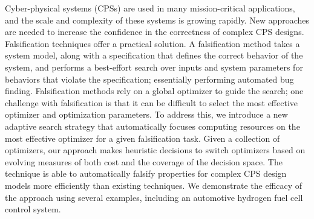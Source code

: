 Cyber-physical systems (CPSs) are used in many mission-critical applications, and the scale and complexity of these systems is growing rapidly.
New approaches are needed to increase the confidence in the correctness of complex CPS designs.
Falsification techniques offer a practical solution. 
A falsification method takes a system model, along with a specification that defines the correct behavior of the system, and performs a best-effort search over inputs and system parameters for behaviors that violate the specification; essentially performing automated bug finding.
Falsification methods rely on a global optimizer to guide the search; one challenge with falsification is that it can be difficult to select the most effective optimizer and optimization parameters.
To address this, we introduce a new adaptive search strategy that automatically focuses computing resources on the most effective optimizer for a given falsification task.
Given a collection of optimizers, our approach makes heuristic decisions to switch optimizers based on
evolving measures of both cost and the coverage of the decision space.
The technique is able to automatically falsify properties for complex CPS design models more efficiently than existing techniques.
We demonstrate the efficacy of the approach using several examples, including an automotive hydrogen fuel cell control system.